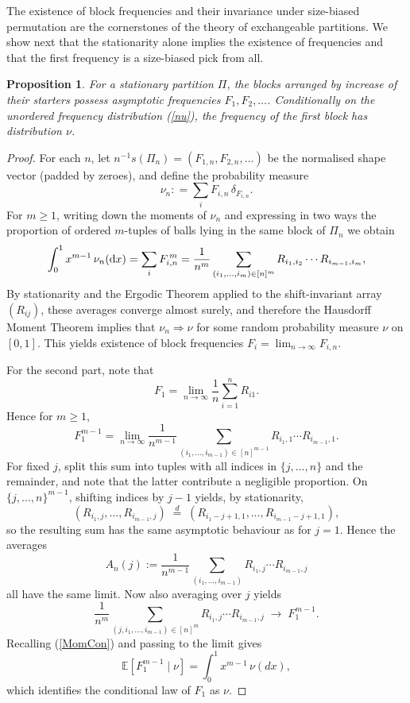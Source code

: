 \documentclass{article}
\newtheorem{proposition}{Proposition}
\begin{document}
The existence of block frequencies and their invariance under size-biased  permutation are the cornerstones of the theory of exchangeable partitions. We show next that 
the stationarity alone implies the existence of frequencies and that the  first frequency is a size-biased pick from all.


\begin{proposition}\label{StaPr}
For a stationary partition $\Pi$, the blocks arranged by increase of their starters possess asymptotic frequencies $F_1,F_2,\ldots$. Conditionally on the unordered frequency distribution
{\rm (\ref{nu})}, the frequency of the first block has distribution $\nu$.
\end{proposition}

\begin{proof}
For each $n$, let $n^{-1}s(\Pi_n)=(F_{1,n},F_{2,n},\ldots)$ be the normalised shape vector (padded by zeroes), and define the  probability measure
\[
\nu_n: = \sum_i F_{i,n}\,\delta_{F_{i,n}}.
\]
For $m\ge1$, writing down the moments of $\nu_n$ and expressing in two ways the  proportion of ordered $m$-tuples of balls lying in the same block of $\Pi_n$ we obtain
\begin{equation}\label{MomCon}
\int_0^1 x^{m-1}\,\nu_n({\rm d}x)=\sum_i F_{i,n}^{\,m}
=
\frac{1}{n^{m}}
\sum_{(i_1,\ldots,i_m)\in[n]^m}
R_{i_1,i_2}\cdots R_{i_{m-1},i_m},
\end{equation}
By stationarity and the Ergodic Theorem applied to the shift-invariant array $(R_{ij})$, these averages converge almost surely, and therefore 
the Hausdorff Moment Theorem implies that 
$\nu_n \Rightarrow \nu$ for some random probability measure $\nu$ on $[0,1]$. This yields existence of block frequencies $F_i=\lim_{n\to\infty} F_{i,n}$.

For the second part, note that
\[
F_1 = \lim_{n\to\infty} \frac{1}{n}\sum_{i=1}^n R_{i1}.
\]
Hence for $m\ge1$,
\[
F_1^{m-1}
=
\lim_{n\to\infty}
\frac{1}{n^{m-1}}
\sum_{(i_1,\ldots,i_{m-1})\in[n]^{m-1}}
R_{i_1,1}\cdots R_{i_{m-1},1}.
\]
For fixed $j$, split this sum into tuples with all indices in $\{j,\ldots,n\}$ and the remainder, and note that the latter contribute a negligible proportion. 
On $\{j,\ldots,n\}^{m-1}$, shifting indices by $j-1$ yields, by stationarity,
$$(R_{i_1,j},\ldots,R_{i_{m-1},j})
\;\stackrel{d}{=}\;
(R_{i_1-j+1,1},\ldots,R_{i_{m-1}-j+1,1}),
$$
so the resulting sum has the same asymptotic behaviour as for $j=1$. Hence the averages
\[
A_n(j):=\frac{1}{n^{m-1}}\sum_{(i_1,\ldots,i_{m-1})} R_{i_1,j}\cdots R_{i_{m-1},j}
\]
all have the same limit. Now also averaging over $j$ yields
\[
\frac{1}{n^{m}}
\sum_{(j,i_1,\ldots,i_{m-1})\in[n]^m}
R_{i_1,j}\cdots R_{i_{m-1},j}
\;\to\;
F_1^{m-1}.
\]
Recalling (\ref{MomCon})
and passing to the limit gives
\[
\mathbb{E}[F_1^{m-1}\mid \nu]
=
\int_0^1 x^{m-1}\,\nu(dx),
\]
which identifies the conditional law of $F_1$ as $\nu$.
\end{proof}
\end{document}
